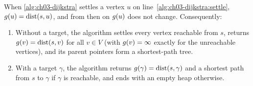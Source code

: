\begin{theorem}
\label{thm:ch03-invariant}
%
When \cref{alg:ch03-dijkstra} settles a vertex $u$ on line~\ref{alg:ch03-dijkstra:settle},
$g(u)=\operatorname{dist}(s,u)$, and from then on $g(u)$ does not change. Consequently:
\begin{enumerate}
  \item Without a target, the algorithm settles every vertex reachable from $s$, returns
$g(v)=\operatorname{dist}(s,v)$ for all $v\in V$ (with $g(v)=\infty$ exactly for the unreachable
vertices), and its parent pointers form a shortest-path tree.
  \item With a target $\gamma$, the algorithm returns $g(\gamma)=\operatorname{dist}(s,\gamma)$ and a shortest path
from $s$ to $\gamma$ if $\gamma$ is reachable, and ends with an empty heap otherwise.
\end{enumerate}
\end{theorem}
